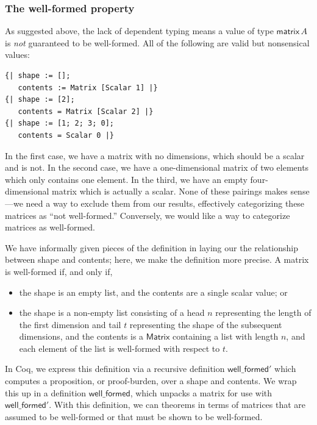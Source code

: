 \documentclass[11pt,conference]{IEEEtran}
\newcommand{\var}[1]{\mathit{#1}}
\newcommand{\func}[1]{\mathsf{#1}}
\theoremstyle{plain} %
\theoremstyle{definition}
\theoremstyle{remark}
\begin{document}
\subsubsection{The well-formed property}

As suggested above, the lack of dependent typing means a value of type
\(\func{matrix}\, \var{A}\) is \emph{not} guaranteed to be well-formed. All of
the following are valid but nonsensical values:

\begin{verbatim}
{| shape := [];
   contents := Matrix [Scalar 1] |}
{| shape := [2];
   contents = Matrix [Scalar 2] |}
{| shape := [1; 2; 3; 0];
   contents = Scalar 0 |}
\end{verbatim}

In the first case, we have a matrix with no dimensions, which should be a scalar
and is not. In the second case, we have a one-dimensional matrix of two
elements which only contains one element. In the third, we have an empty
four-dimensional matrix which is actually a scalar. None of these pairings makes
sense---we need a way to exclude them from our results, effectively categorizing
these matrices as ``not well-formed.'' Conversely, we would like a way to
categorize matrices as well-formed.

We have informally given pieces of the definition in laying our the relationship
between shape and contents; here, we make the definition more precise. A matrix
is well-formed if, and only if,
\begin{itemize}
    \item the shape is an empty list, and the contents are a single scalar value;
        or
    \item the shape is a non-empty list consisting of a head \(n\) representing
        the length of the first dimension and tail \(t\) representing the shape
        of the subsequent dimensions, and the contents is a \(\func{Matrix}\)
        containing a list with length \(n\), and each element of the list is
        well-formed with respect to \(t\).
\end{itemize}
In Coq, we express this definition via a recursive definition
\(\func{well\_formed'}\) which computes a proposition, or proof-burden, over a
shape and contents. We wrap this up in a definition \(\func{well\_formed}\),
which unpacks a matrix for use with \(\func{well\_formed'}\). With this
definition, we can theorems in terms of matrices that are assumed to be
well-formed or that must be shown to be well-formed.
\end{document}
